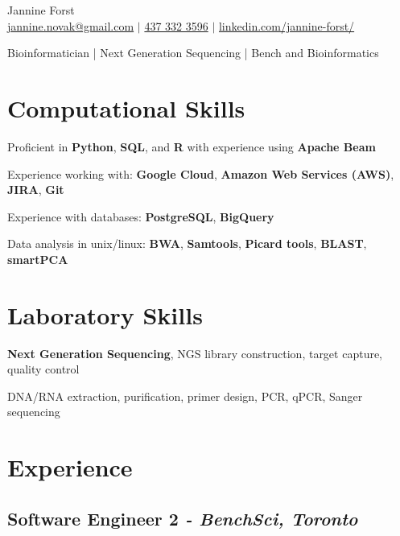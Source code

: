 \documentclass[11pt]{article}
\begin{document}
\begin{center}
    {\fontsize{36}{36}\selectfont\interthin Jannine \interheavy Forst} \\ \bigskip
    {\color{icnclr}\faEnvelope[regular]} \href{mailto:jannine.novak@gmail.com}{jannine.novak@gmail.com} $|$ 
    {\color{icnclr}} \href{tel:1234567890}{437 332 3596} $|$
    {\color{icnclr}\faLinkedinIn} \href{https://www.linkedin.com/in/jannine-forst/}{linkedin.com/jannine-forst/}

    \item{Bioinformatician | Next Generation Sequencing | Bench and Bioinformatics}
\end{center}

\section{Computational Skills}
\begin{description}
    \item Proficient in \textbf{Python}, \textbf{SQL}, and \textbf{R} with experience using \textbf{Apache Beam}
    \item Experience working with: \textbf{Google Cloud}, \textbf{Amazon Web Services (AWS)}, \textbf{JIRA}, \textbf{Git}
    \item Experience with databases: \textbf{PostgreSQL}, \textbf{BigQuery}
    \item Data analysis in unix/linux: \textbf{BWA}, \textbf{Samtools}, \textbf{Picard tools}, \textbf{BLAST}, \textbf{smartPCA}
\end{description}

\section{Laboratory Skills}
\begin{description}
    \item \textbf{Next Generation Sequencing}, NGS library construction, target capture, quality control
    \item DNA/RNA extraction, purification, primer design, PCR, qPCR, Sanger sequencing
\end{description}


\section{Experience}
\bigskip
\subsection{Software Engineer 2 \normalfont\textit{- BenchSci, Toronto}}
\end{document}
